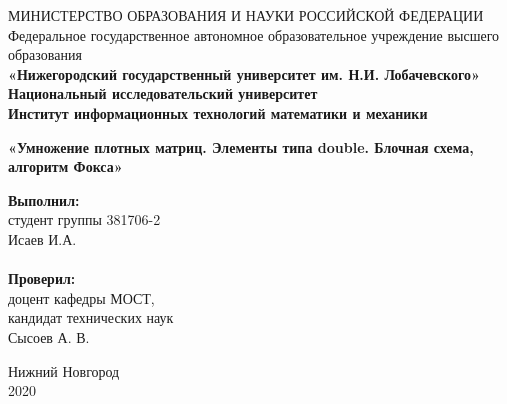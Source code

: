 \documentclass{report}
\begin{document}
\begin{titlepage}

\begin{center}
МИНИСТЕРСТВО ОБРАЗОВАНИЯ И НАУКИ РОССИЙСКОЙ ФЕДЕРАЦИИ \\
Федеральное государственное автономное образовательное учреждение высшего образования\\
\textbf{«Нижегородский государственный университет им. Н.И. Лобачевского»} \\
\textbf{Национальный исследовательский университет} \\
\textbf{Институт информационных технологий математики и механики}\\
\end{center}

\vskip 3cm

\begin{center}
\textbf{}
\end{center}

\begin{center}
\textbf{\Large«Умножение плотных матриц. Элементы типа double. Блочная схема, алгоритм Фокса»}
\end{center}

\vskip 1cm

\newbox{\lbox}
\newlength{\maxl}
\setlength{\maxl}{\wd\lbox}
\hfill\parbox{7cm}{
\hspace*{5cm}\hspace*{-5cm}\textbf{Выполнил:} \\ студент группы 381706-2 \\ Исаев И.А. \\
\\
\hspace*{5cm}\hspace*{-5cm}\textbf{Проверил:}\\ доцент кафедры МОСТ, \\ кандидат технических наук \\ Сысоев А. В.}

\vskip 7cm

\begin{center}
Нижний Новгород \\
2020
\end{center}

\end{titlepage}

\tableofcontents
\setcounter{page}{2}

\newpage
\end{document}
